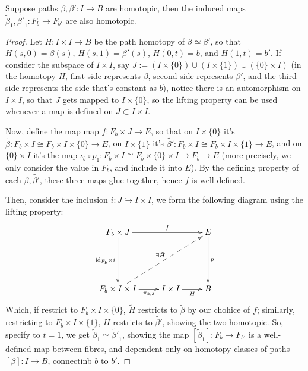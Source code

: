 \documentclass{article}
\begin{document}
\begin{prop}
    Suppose paths $\beta,\beta':I\rightarrow B$ are homotopic, then the induced maps $\tilde{\beta}_1,\tilde{\beta'}_1:F_b\rightarrow F_{b'}$ are also homotopic.
\end{prop}
\begin{proof}
    Let $H:I\times I\rightarrow B$ be the path homotopy of $\beta\simeq \beta'$, so that $H(s,0)=\beta(s)$, $H(s,1)=\beta'(s)$, $H(0,t)=b$, and $H(1,t)=b'$. If consider the subspace of $I\times I$, say $J := (I\times \{0\})\cup (I\times \{1\})\cup (\{0\}\times I)$ (in the homotopy $H$, first side represents $\beta$, second side represents $\beta'$, and the third side represents the side that's constant as $b$), notice there is an automorphism on $I\times I$, so that $J$ gets mapped to $I\times \{0\}$, so the lifting property can be used whenever a map is defined on $J\subset I\times I$.

    Now, define the map map $f:F_b\times J\rightarrow E$, so that on $I\times \{0\}$ it's $\tilde{\beta}:F_b\times I\cong F_b\times I\times \{0\}\rightarrow E$, on $I\times \{1\}$ it's $\tilde{\beta'}:F_b\times I\cong F_b\times I\times \{1\}\rightarrow E$, and on $\{0\}\times I$ it's the map $\iota_b\circ p_1:F_b\times I \cong F_b\times \{0\}\times I \rightarrow F_b \rightarrow E$ (more precisely, we only consider the value in $F_b$, and include it into $E$). By the defining property of each $\tilde{\beta},\tilde{\beta'}$, these three maps glue together, hence $f$ is well-defined. 

    Then, consider the inclusion $i:J\hookrightarrow I\times I$, we form the following diagram using the lifting property:
    \[\xymatrix{
        F_b\times J \ar[dd]_-{\id_{F_b}\times i} \ar[rr]^-{f} && E \ar[dd]^-{p}\\
        \\
        F_b\times I\times I \ar@{-->}[uurr]^-{\exists \tilde{H}} \ar[r]_-{\pi_{2,3}} & I\times I \ar[r]_-{H} & B
    }\]
    Which, if restrict to $F_b\times I\times \{0\}$, $\tilde{H}$ restricts to $\tilde{\beta}$ by our chohice of $f$; similarly, restricting to $F_b\times I\times \{1\}$, $\tilde{H}$ restricts to $\tilde{\beta'}$, showing the two homotopic. So, specify to $t=1$, we get $\tilde{\beta}_1\simeq \tilde{\beta'}_1$, showing the map $[\tilde{\beta}_1]:F_b\rightarrow F_{b'}$ is a well-defined map between fibres, and dependent only on homotopy classes of paths $[\beta]:I\rightarrow B$, connectinb $b$ to $b'$.
\end{proof}
\end{document}
